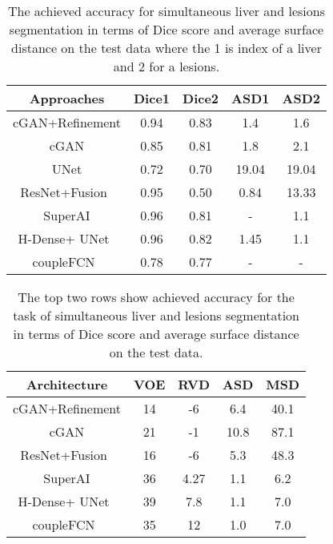\documentclass[10pt,twocolumn,letterpaper]{article}
\begin{document}
\begin{table}[!htbp]
\centering
\caption{The achieved accuracy for simultaneous liver and lesions segmentation in terms of Dice score and average surface distance on the test data where the 1 is index of a liver and 2 for a lesions.}
\begin{tabular}{*5c} 
\toprule
Approaches & Dice1  & Dice2 & ASD1 & ASD2 \\
\midrule
cGAN+Refinement   &  0.94 & 0.83  & 1.4 & 1.6 \\
cGAN   &  0.85 & 0.81  & 1.8  &  2.1  \\
UNet   &  0.72 & 0.70  & 19.04  &  19.04    \\
ResNet+Fusion~\cite{BiKKF17} & 0.95 & 0.50  & 0.84 &  13.33  \\
SuperAI & 0.96  & 0.81  & -  &  1.1   \\
H-Dense+ UNet~\cite{Han17a} &  0.96 & 0.82  & 1.45  & 1.1    \\
coupleFCN~\cite{VorontsovCTPK17} &  0.78 & 0.77  & -  &  -    \\
\bottomrule
\end{tabular}
\label{dice_asd_liver}
\end{table}\begin{table}[!htbp]
\centering
\caption{The top two rows show achieved accuracy for the task of simultaneous liver and lesions segmentation in terms of Dice score and average surface distance on the test data.}
\begin{tabular}{*5c} 
\toprule
Architecture & VOE  & RVD & ASD & MSD \\
\midrule
cGAN+Refinement   &  14 & -6  & 6.4 & 40.1 \\
cGAN   &  21 & -1  & 10.8  &  87.1  \\
ResNet+Fusion~\cite{BiKKF17} & 16 & -6  & 5.3 &  48.3 \\
SuperAI & 36 & 4.27  & 1.1 &  6.2 \\
H-Dense+ UNet~\cite{Han17a} &  39 & 7.8  & 1.1 &  7.0 \\
coupleFCN~\cite{VorontsovCTPK17} & 35 & 12  & 1.0 &  7.0 \\
\bottomrule
\end{tabular}
\label{ourmertricliver}
\end{table}
\end{document}
